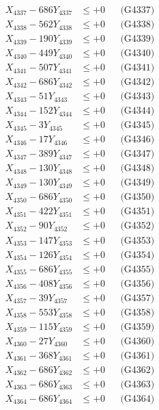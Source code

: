 \documentclass[a4paper,10pt]{article}
\begin{document}
{\begin{align}
X_{4337} - 686Y_{4337} &\leq +0 && \text{(G4337)} \\
X_{4338} - 562Y_{4338} &\leq +0 && \text{(G4338)} \\
X_{4339} - 190Y_{4339} &\leq +0 && \text{(G4339)} \\
X_{4340} - 449Y_{4340} &\leq +0 && \text{(G4340)} \\
\allowbreak
X_{4341} - 507Y_{4341} &\leq +0 && \text{(G4341)} \\
X_{4342} - 686Y_{4342} &\leq +0 && \text{(G4342)} \\
X_{4343} - 51Y_{4343} &\leq +0 && \text{(G4343)} \\
X_{4344} - 152Y_{4344} &\leq +0 && \text{(G4344)} \\
X_{4345} - 3Y_{4345} &\leq +0 && \text{(G4345)} \\
X_{4346} - 17Y_{4346} &\leq +0 && \text{(G4346)} \\
X_{4347} - 389Y_{4347} &\leq +0 && \text{(G4347)} \\
X_{4348} - 130Y_{4348} &\leq +0 && \text{(G4348)} \\
X_{4349} - 130Y_{4349} &\leq +0 && \text{(G4349)} \\
X_{4350} - 686Y_{4350} &\leq +0 && \text{(G4350)} \\
\allowbreak
X_{4351} - 422Y_{4351} &\leq +0 && \text{(G4351)} \\
X_{4352} - 90Y_{4352} &\leq +0 && \text{(G4352)} \\
X_{4353} - 147Y_{4353} &\leq +0 && \text{(G4353)} \\
X_{4354} - 126Y_{4354} &\leq +0 && \text{(G4354)} \\
X_{4355} - 686Y_{4355} &\leq +0 && \text{(G4355)} \\
X_{4356} - 408Y_{4356} &\leq +0 && \text{(G4356)} \\
X_{4357} - 39Y_{4357} &\leq +0 && \text{(G4357)} \\
X_{4358} - 553Y_{4358} &\leq +0 && \text{(G4358)} \\
X_{4359} - 115Y_{4359} &\leq +0 && \text{(G4359)} \\
X_{4360} - 27Y_{4360} &\leq +0 && \text{(G4360)} \\
\allowbreak
X_{4361} - 368Y_{4361} &\leq +0 && \text{(G4361)} \\
X_{4362} - 686Y_{4362} &\leq +0 && \text{(G4362)} \\
X_{4363} - 686Y_{4363} &\leq +0 && \text{(G4363)} \\
X_{4364} - 686Y_{4364} &\leq +0 && \text{(G4364)} \\

\end{align}}
\end{document}
